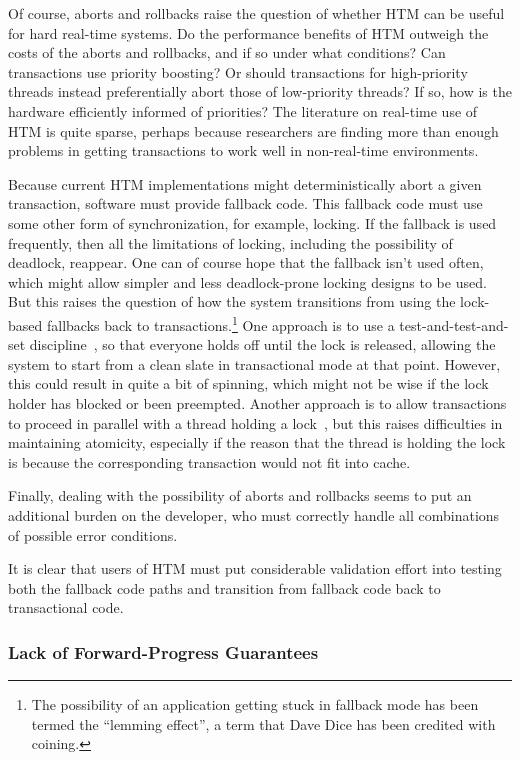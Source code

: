 Of course, aborts and rollbacks raise the question of whether HTM can
be useful for hard real-time systems.
Do the performance benefits of HTM outweigh the costs of the aborts
and rollbacks, and if so under what conditions?
Can transactions use priority boosting?
Or should transactions for high-priority threads instead preferentially
abort those of low-priority threads?
If so, how is the hardware efficiently informed of priorities?
The literature on real-time use of HTM is quite sparse, perhaps because
researchers are finding more than enough problems in getting
transactions to work well in non-real-time environments.

Because current HTM implementations might deterministically abort a
given transaction, software must provide fallback code.
This fallback code must use some other form of synchronization, for
example, locking.
If the fallback is used frequently, then all the limitations of locking,
including the possibility of deadlock, reappear.
One can of course hope that the fallback isn't used often, which might
allow simpler and less deadlock-prone locking designs to be used.
But this raises the question of how the system transitions from using
the lock-based fallbacks back to transactions.\footnote{
	The possibility of an application getting stuck in fallback
	mode has been termed the ``lemming effect'', a term that
	Dave Dice has been credited with coining.}
One approach is to use a test-and-test-and-set discipline~\cite{Martinez02a},
so that everyone holds off until the lock is released, allowing the
system to start from a clean slate in transactional mode at that point.
However, this could result in quite a bit of spinning, which might not
be wise if the lock holder has blocked or been preempted.
Another approach is to allow transactions to proceed in parallel with
a thread holding a lock~\cite{Martinez02a}, but this raises difficulties
in maintaining atomicity, especially if the reason that the thread is
holding the lock is because the corresponding transaction would not fit
into cache.

Finally, dealing with the possibility of aborts and rollbacks seems to
put an additional burden on the developer, who must correctly handle
all combinations of possible error conditions.

It is clear that users of HTM must put considerable validation effort
into testing both the fallback code paths and transition from fallback
code back to transactional code.

\subsubsection{Lack of Forward-Progress Guarantees}
\label{sec:future:Lack of Forward-Progress Guarantees}

